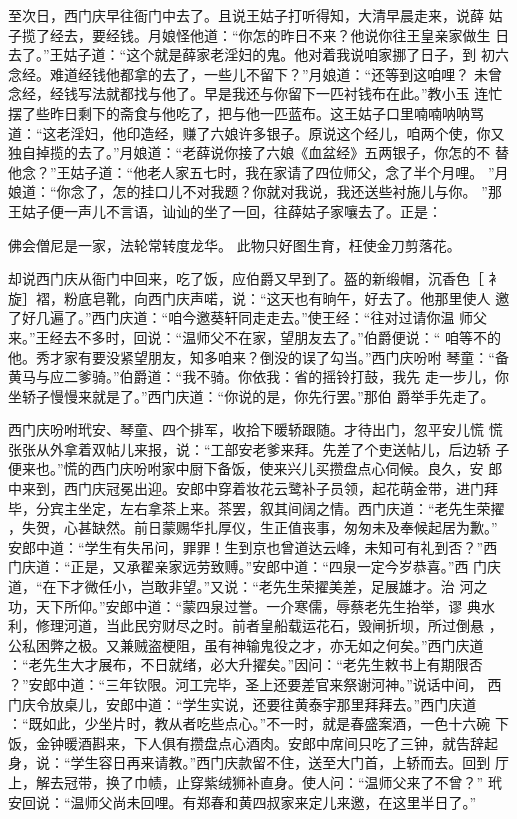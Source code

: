 至次日，西门庆早往衙门中去了。且说王姑子打听得知，大清早晨走来，说薛
姑子揽了经去，要经钱。月娘怪他道：“你怎的昨日不来？他说你往王皇亲家做生
日去了。”王姑子道：“这个就是薛家老淫妇的鬼。他对着我说咱家挪了日子，到
初六念经。难道经钱他都拿的去了，一些儿不留下？”月娘道：“还等到这咱哩？
未曾念经，经钱写法就都找与他了。早是我还与你留下一匹衬钱布在此。”教小玉
连忙摆了些昨日剩下的斋食与他吃了，把与他一匹蓝布。这王姑子口里喃喃呐呐骂
道：“这老淫妇，他印造经，赚了六娘许多银子。原说这个经儿，咱两个使，你又
独自掉揽的去了。”月娘道：“老薛说你接了六娘《血盆经》五两银子，你怎的不
替他念？”王姑子道：“他老人家五七时，我在家请了四位师父，念了半个月哩。
”月娘道：“你念了，怎的挂口儿不对我题？你就对我说，我还送些衬施儿与你。
”那王姑子便一声儿不言语，讪讪的坐了一回，往薛姑子家嚷去了。正是：

佛会僧尼是一家，法轮常转度龙华。
此物只好图生育，枉使金刀剪落花。

却说西门庆从衙门中回来，吃了饭，应伯爵又早到了。盔的新缎帽，沉香色［
衤旋］褶，粉底皂靴，向西门庆声喏，说：“这天也有晌午，好去了。他那里使人
邀了好几遍了。”西门庆道：“咱今邀葵轩同走走去。”使王经：“往对过请你温
师父来。”王经去不多时，回说：“温师父不在家，望朋友去了。”伯爵便说：“
咱等不的他。秀才家有要没紧望朋友，知多咱来？倒没的误了勾当。”西门庆吩咐
琴童：“备黄马与应二爹骑。”伯爵道：“我不骑。你依我：省的摇铃打鼓，我先
走一步儿，你坐轿子慢慢来就是了。”西门庆道：“你说的是，你先行罢。”那伯
爵举手先走了。

西门庆吩咐玳安、琴童、四个排军，收拾下暖轿跟随。才待出门，忽平安儿慌
慌张张从外拿着双帖儿来报，说：“工部安老爹来拜。先差了个吏送帖儿，后边轿
子便来也。”慌的西门庆吩咐家中厨下备饭，使来兴儿买攒盘点心伺候。良久，安
郎中来到，西门庆冠冕出迎。安郎中穿着妆花云鹭补子员领，起花萌金带，进门拜
毕，分宾主坐定，左右拿茶上来。茶罢，叙其间阔之情。西门庆道：“老先生荣擢
，失贺，心甚缺然。前日蒙赐华扎厚仪，生正值丧事，匆匆未及奉候起居为歉。”
安郎中道：“学生有失吊问，罪罪！生到京也曾道达云峰，未知可有礼到否？”西
门庆道：“正是，又承翟亲家远劳致赙。”安郎中道：“四泉一定今岁恭喜。”西
门庆道，“在下才微任小，岂敢非望。”又说：“老先生荣擢美差，足展雄才。治
河之功，天下所仰。”安郎中道：“蒙四泉过誉。一介寒儒，辱蔡老先生抬举，谬
典水利，修理河道，当此民穷财尽之时。前者皇船载运花石，毁闸折坝，所过倒悬
，公私困弊之极。又兼贼盗梗阻，虽有神输鬼役之才，亦无如之何矣。”西门庆道
：“老先生大才展布，不日就绪，必大升擢矣。”因问：“老先生敕书上有期限否
？”安郎中道：“三年钦限。河工完毕，圣上还要差官来祭谢河神。”说话中间，
西门庆令放桌儿，安郎中道：“学生实说，还要往黄泰宇那里拜拜去。”西门庆道
：“既如此，少坐片时，教从者吃些点心。”不一时，就是春盛案酒，一色十六碗
下饭，金钟暖酒斟来，下人俱有攒盘点心酒肉。安郎中席间只吃了三钟，就告辞起
身，说：“学生容日再来请教。”西门庆款留不住，送至大门首，上轿而去。回到
厅上，解去冠带，换了巾帻，止穿紫绒狮补直身。使人问：“温师父来了不曾？”
玳安回说：“温师父尚未回哩。有郑春和黄四叔家来定儿来邀，在这里半日了。”

